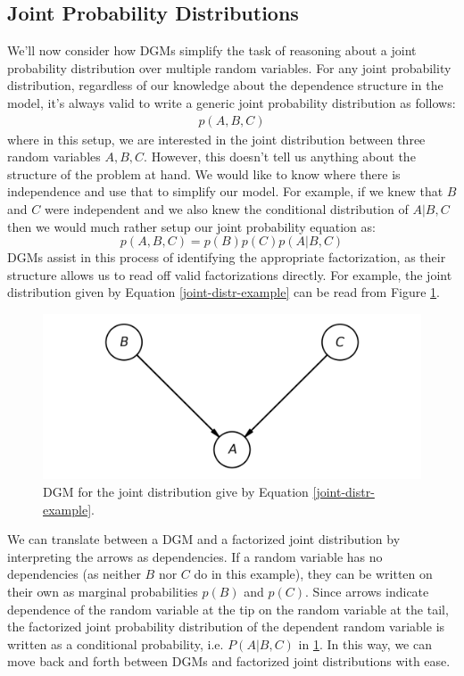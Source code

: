 \subsection{Joint Probability Distributions}
We'll now consider how DGMs simplify the task of reasoning about a joint probability distribution over multiple random variables. For any joint probability distribution, regardless of our knowledge about the dependence structure in the model, it's always valid to write a generic joint probability distribution as follows:
\begin{align*}
	p(A, B, C)
\end{align*}
where in this setup, we are interested in the joint distribution between three random variables $A, B, C$. However, this doesn't tell us anything about the structure of the problem at hand. We would like to know where there is independence and use that to simplify our model. For example, if we knew that $B$ and $C$ were independent and we also knew the conditional distribution of $A | B, C$ then we would much rather setup our joint probability equation as:
\begin{equation} \label{joint-distr-example}
	p(A, B, C) = p(B)p(C)p(A | B, C)
\end{equation}
DGMs assist in this process of identifying the appropriate factorization, as their structure allows us to read off valid factorizations directly. For example, the joint distribution given by Equation \ref{joint-distr-example} can be read from Figure \ref{fig:joint-distr-example-dgm}.
\begin{figure}
    \centering
    \includegraphics[width=0.5\paperwidth]{../GraphicalModels/fig/joint-distr-example-dgm.png}
    \caption{DGM for the joint distribution give by Equation \ref{joint-distr-example}.}
    \label{fig:joint-distr-example-dgm}
\end{figure}

We can translate between a DGM and a factorized joint distribution by interpreting the arrows as dependencies. If a random variable has no dependencies (as neither $B$ nor $C$ do in this example), they can be written on their own as marginal probabilities $p(B)$ and $p(C)$. Since arrows indicate dependence of the random variable at the tip on the random variable at the tail, the factorized joint probability distribution of the dependent random variable is written as a conditional probability, i.e. $P(A | B, C)$ in \ref{fig:joint-distr-example-dgm}. In this way, we can move back and forth between DGMs and factorized joint distributions with ease.

